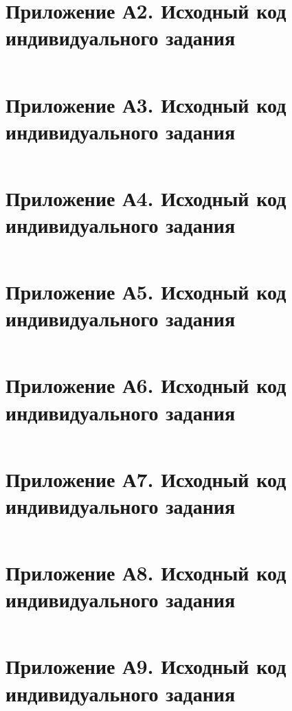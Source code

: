 \documentclass[oneside,a4paper,14pt]{extarticle}
\begin{document}
\clearpage

\section{Приложение А2. Исходный код индивидуального задания}
\inputminted{cpp}{ternary_tiles/include/Game/Renderer.hpp}

\clearpage

\section{Приложение А3. Исходный код индивидуального задания}
\inputminted{cpp}{ternary_tiles/src/Game/Renderer.cpp}

\clearpage

\section{Приложение А4. Исходный код индивидуального задания}
\inputminted{cpp}{ternary_tiles/include/Game/GameBoard.hpp}

\clearpage

\section{Приложение А5. Исходный код индивидуального задания}
\inputminted{cpp}{ternary_tiles/src/Game/GameBoard.cpp}

\clearpage

\section{Приложение А6. Исходный код индивидуального задания}
\inputminted{cpp}{ternary_tiles/include/Game/BalancedTernary.hpp}

\clearpage

\section{Приложение А7. Исходный код индивидуального задания}
\inputminted{cpp}{ternary_tiles/src/Game/BalancedTernary.cpp}

\clearpage

\section{Приложение А8. Исходный код индивидуального задания}
\inputminted{cpp}{ternary_tiles/include/Game/Tile.hpp}

\clearpage

\section{Приложение А9. Исходный код индивидуального задания}
\inputminted{meson}{ternary_tiles/meson.build}
\end{document}
